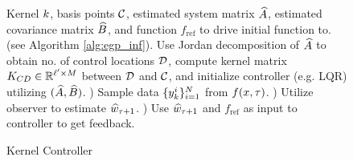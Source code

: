\begin{figure}[tbh]
 \begin{algorithm}[H]
   \caption{Kernel Controller}
   \label{alg:egp_control}
\begin{algorithmic}
\begin{footnotesize}
    Kernel $k$, basis points $\mathcal{C}$,
   estimated system matrix $\widehat{A}$, estimated covariance matrix $\widehat{B}$, and function $f_{\text{ref}}$ 
   to drive initial function to.    
    (see Algorithm \ref{alg:egp_inf}). 
    Use Jordan decomposition of $\widehat{A}$ to obtain  no. of control locations $\mathcal{D}$, compute kernel matrix $K_{CD}\in\mathbb{R}^{\ell'\times M}$ between $\mathcal{D}$ and $\mathcal{C}$, and initialize controller (e.g. LQR) utilizing $(\widehat{A}, \widehat{B})$.
     ) Sample data $\{y^i_k\}_{i=1}^{N}$ from $f(x,\tau)$.    
     ) Utilize observer to estimate $\widehat{w}_{\tau+1}$.
     ) Use $\widehat{w}_{\tau+1}$ and $f_{\text{ref}}$ as input to controller to get feedback. 
   \ENDWHILE   
\end{footnotesize}
\end{algorithmic}
\end{algorithm}
\vspace{-0.2in}
\end{figure}
